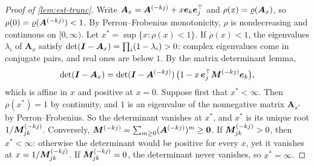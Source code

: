 \begin{proof}[Proof of \cref{lem:est-trunc}]
Write $\bm A_x=\bm{A}^{(-kj)}+x\bm e_k\bm e_j^{\top}$ and $\rho(x)=\varrho(\bm A_x)$, so
$\rho(0)=\varrho(\bm{A}^{(-kj)})<1$. By Perron--Frobenius
monotonicity, $\rho$ is nondecreasing and continuous on $[0,\infty)$. Let
$x^*=\sup\{x:\rho(x)<1\}$. If $\rho(x)<1$, the eigenvalues $\lambda_i$ of $\bm A_x$ satisfy
$\det(\bm{I}-\bm A_x)=\prod_i(1-\lambda_i)>0$: complex eigenvalues come in conjugate pairs,
and real ones are below $1$. By the matrix determinant lemma,
\[
  \det(\bm{I}-\bm A_x)=\det(\bm{I}-\bm{A}^{(-kj)})\,\big(1-x\,\bm e_j^{\top}\bm{M}^{(-kj)}\bm e_k\big),
\]
which is affine in $x$ and positive at $x=0$. Suppose first that $x^*<\infty$. Then
$\rho(x^*)=1$ by continuity, and $1$ is an eigenvalue of the nonnegative matrix
$\bm A_{x^*}$ by Perron--Frobenius. So the determinant vanishes at $x^*$, and $x^*$ is its
unique root $1/\bm{M}^{(-kj)}_{jk}$. Conversely, $\bm{M}^{(-kj)}=\sum_{m\ge0}(\bm{A}^{(-kj)})^m\ge\mathbf{0}$.
If $\bm{M}^{(-kj)}_{jk}>0$, then $x^*<\infty$: otherwise the determinant would be positive
for every $x$, yet it vanishes at $x=1/\bm{M}^{(-kj)}_{jk}$. If $\bm{M}^{(-kj)}_{jk}=0$, the
determinant never vanishes, so $x^*=\infty$.
\end{proof}

